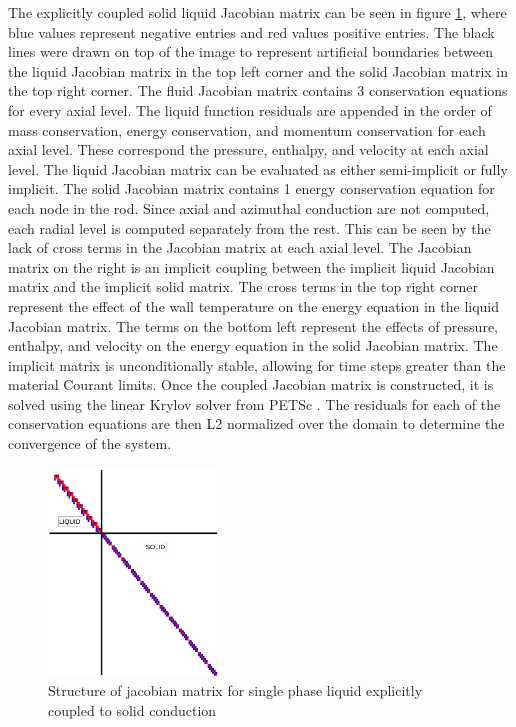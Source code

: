 	The explicitly coupled solid liquid Jacobian matrix can be seen in figure
	\ref{fig:Explicit-Diagram}, where blue values represent negative entries and
	red values positive entries. The black lines were drawn on top of the image to
	represent artificial boundaries between the liquid Jacobian matrix in the top
	left corner and the solid Jacobian matrix in the top right corner. The fluid
	Jacobian matrix contains 3 conservation equations for every axial level. The
	liquid function residuals are appended in the order of mass conservation,
	energy conservation, and momentum conservation for each axial level. These
	correspond the pressure, enthalpy, and velocity at each axial level. The liquid
	Jacobian matrix can be evaluated as either semi-implicit or fully implicit. The
	solid Jacobian matrix contains 1 energy conservation equation for each node in
	the rod. Since axial and azimuthal conduction are not computed, each radial
	level is computed separately from the rest. This can be seen by the lack of
	cross terms in the Jacobian matrix at each axial level. The Jacobian matrix on
	the right is an implicit coupling between the implicit liquid Jacobian matrix
	and the implicit solid matrix. The cross terms in the top right corner
	represent the effect of the wall temperature on the energy equation in the
	liquid Jacobian matrix. The terms on the bottom left represent the effects of
	pressure, enthalpy, and velocity on the energy equation in the solid Jacobian
	matrix. The implicit matrix is unconditionally stable, allowing for time steps
	greater than the material Courant limits. Once the coupled Jacobian matrix is
	constructed, it is solved using the linear Krylov solver \cite{kelly2003} from
	PETSc \cite{PETSc}. The residuals for each of the conservation equations are
	then L2 normalized over the domain to determine the convergence of the system.
	
	\begin{figure}[!h]
    	\centering
    	\includegraphics[width=0.40\textwidth]{images/Explicit-Diagram.jpg}
    	\caption{Structure of jacobian matrix for single phase liquid
    	explicitly coupled to solid conduction}
    	\label{fig:Explicit-Diagram}
    \end{figure}
    
